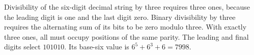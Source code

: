 Divisibility of the six-digit decimal string by three requires three ones, because the leading digit is one and the last digit zero. Binary divisibility by three requires the alternating sum of its bits to be zero modulo three. With exactly three ones, all must occupy positions of the same parity. The leading and final digits select $101010$. Its base-six value is $6^5+6^3+6=\boxed{7998}$.

